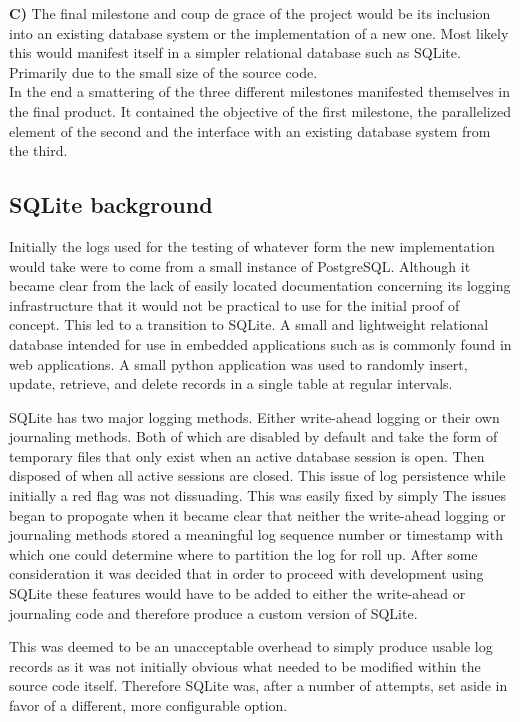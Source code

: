 \documentclass{article}
\begin{document}
\textbf{C)} The final milestone and coup de grace of the project would be its inclusion into an existing
database system or the implementation of a new one. Most likely this would manifest itself in a simpler
relational database such as SQLite. Primarily due to the small size of the source code.\\

In the end a smattering of the three different milestones manifested themselves in the final product. It contained the objective of the first milestone, the parallelized element of the second and the interface with an existing database system from the third.\\

\subsection{SQLite background}
Initially the logs used for the testing of whatever form the new implementation would take were to come from a small instance of PostgreSQL. Although it became clear from the lack of easily located documentation concerning its logging infrastructure that it would not be practical to use for the initial proof of concept. This led to a transition to SQLite. A small and lightweight relational database intended for use in embedded applications such as is commonly found in web applications. A small python application was used to randomly insert, update, retrieve, and delete records in a single table at regular intervals.
 
SQLite has two major logging methods. Either write-ahead logging or their own journaling methods. Both of which are disabled by default and take the form of temporary files that only exist when an active database session is open. Then disposed of when all active sessions are closed. This issue of log persistence while initially a red flag was not dissuading. This was easily fixed by simply The issues began to propogate when it became clear that neither the write-ahead logging or journaling methods stored a meaningful log sequence number or timestamp with which one could determine where to partition the log for roll up. After some consideration it was decided that in order to proceed with development using SQLite these features would have to be added to either the write-ahead or journaling code and therefore produce a custom version of SQLite.

This was deemed to be an unacceptable overhead to simply produce usable log records as it was not initially obvious what needed to be modified within the source code itself. Therefore SQLite was, after a number of attempts, set aside in favor of a different, more configurable option.
\end{document}
